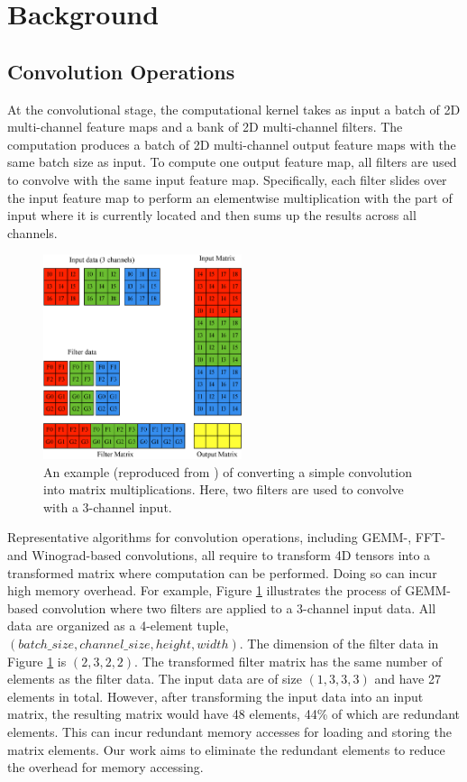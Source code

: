 
\section{Background}

\subsection{Convolution Operations}

At the convolutional stage, the computational kernel takes as input a batch of 2D multi-channel feature maps and a bank of  2D
multi-channel filters. The computation produces a batch of 2D multi-channel output feature maps with the same batch size as input. To
compute one output feature map, all filters are used to convolve with the same input feature map. Specifically, each filter slides over the
input feature map to perform an elementwise multiplication with the part of input where it is currently located and then sums up the
results across all channels.

\begin{figure}
\centering
  \includegraphics[width=0.75\columnwidth,height=6cm]{./figure/convlowering.eps}
  \caption{An example (reproduced from \cite{ChetlurWVCTCS14}) of converting a simple convolution into matrix multiplications. Here, two filters are used to convolve with a 3-channel input.}
  \label{fig:convlowering}
\end{figure}

Representative algorithms for convolution operations, including GEMM-, FFT- and Winograd-based convolutions, all require to transform 4D
tensors into a transformed matrix where computation can be performed. Doing so can incur high memory overhead. For example, Figure
\ref{fig:convlowering} illustrates the process of GEMM-based convolution where two filters are applied to a 3-channel input data. All data
are organized as a 4-element tuple, $(batch\_size, channel\_size, height, width)$. The dimension of the filter data in Figure
\ref{fig:convlowering} is $(2, 3, 2, 2)$. The transformed filter matrix has the same number of elements as the filter data. The input data
are of size $(1, 3, 3, 3)$ and have 27 elements in total. However, after transforming the input data into an input matrix, the resulting
matrix would have 48 elements, 44\% of which are redundant elements. This can incur redundant memory accesses for loading and storing the
matrix elements. Our work aims to eliminate the redundant elements to reduce the overhead for memory accessing. 



